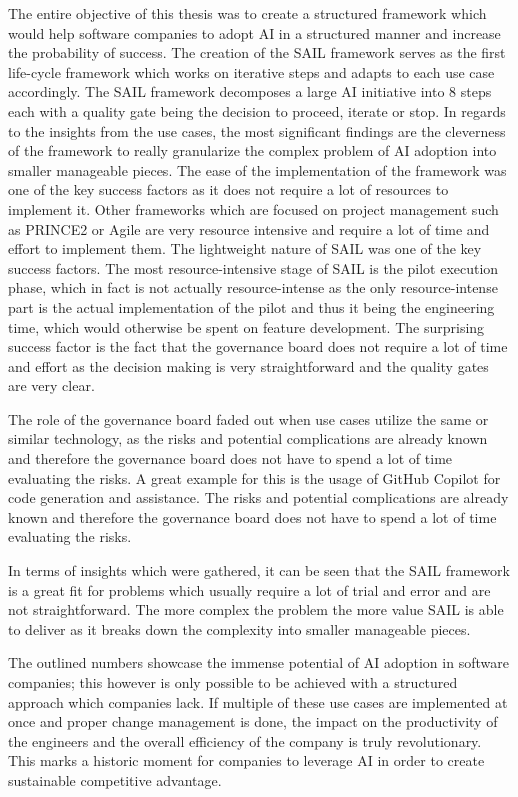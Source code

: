 \documentclass[]{imc-inf}
\begin{document}
The entire objective of this thesis was to create a structured framework
which would help software companies to adopt AI in a structured manner
and increase the probability of success. The creation of the SAIL framework
serves as the first life-cycle framework which works on iterative steps
and adapts to each use case accordingly. The SAIL framework decomposes a
large AI initiative into 8 steps each with a quality gate being the
decision to proceed, iterate or stop. In regards to the insights from
the use cases, the most significant findings are the cleverness of the
framework to really granularize the complex problem of AI adoption into
smaller manageable pieces. The ease of the implementation of the
framework was one of the key success factors as it does not require a lot
of resources to implement it. Other frameworks which are focused on
project management such as PRINCE2 or Agile are very resource intensive
and require a lot of time and effort to implement them. The lightweight
nature of SAIL was one of the key success factors. The most resource-intensive stage of SAIL is the pilot execution phase, which in fact is
not actually resource-intense as the only resource-intense part is the
actual implementation of the pilot and thus it being the engineering
time, which would otherwise be spent on feature development. The
surprising success factor is the fact that the governance board does not
require a lot of time and effort as the decision making is very
straightforward and the quality gates are very clear.

The role of the governance board faded out when use cases utilize the same
or similar technology, as the risks and potential complications are
already known and therefore the governance board does not have to spend
a lot of time evaluating the risks. A great example for this is the usage
of GitHub Copilot for code generation and assistance. The risks and
potential complications are already known and therefore the governance
board does not have to spend a lot of time evaluating the risks.

In terms of insights which were gathered, it can be seen that the SAIL
framework is a great fit for problems which usually require a lot of
trial and error and are not straightforward. The more complex the
problem the more value SAIL is able to deliver as it breaks down the
complexity into smaller manageable pieces.


The outlined numbers showcase the immense potential of AI adoption in
software companies; this however is only possible to be achieved with a
structured approach which companies lack. If
multiple of these use cases are implemented at once and proper change
management is done, the impact on the productivity of the engineers and
the overall efficiency of the company is truly revolutionary. This marks
a historic moment for companies to leverage AI in order to create
sustainable competitive advantage.
\end{document}
